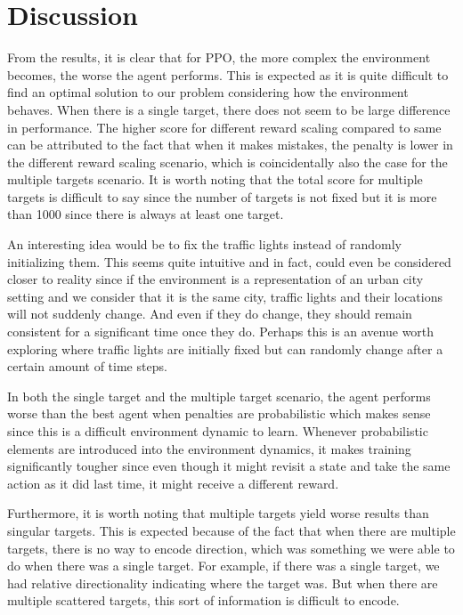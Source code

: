\documentclass{article}
\begin{document}
    \section{Discussion}
    \label{discussion}
    From the results, it is clear that for PPO, the more complex the environment becomes, the worse the agent performs. This is expected as it is quite difficult to find an optimal solution to our problem considering how the environment behaves. When there is a single target, there does not seem to be large difference in performance. The higher score for different reward scaling compared to same can be attributed to the fact that when it makes mistakes, the penalty is lower in the different reward scaling scenario, which is coincidentally also the case for the multiple targets scenario. It is worth noting that the total score for multiple targets is difficult to say since the number of targets is not fixed but it is more than 1000 since there is always at least one target.
    
    An interesting idea would be to fix the traffic lights instead of randomly initializing them. This seems quite intuitive and in fact, could even be considered closer to reality since if the environment is a representation of an urban city setting and we consider that it is the same city, traffic lights and their locations will not suddenly change. And even if they do change, they should remain consistent for a significant time once they do. Perhaps this is an avenue worth exploring where traffic lights are initially fixed but can randomly change after a certain amount of time steps. 
    
    In both the single target and the multiple target scenario, the agent performs worse than the best agent when penalties are probabilistic which makes sense since this is a difficult environment dynamic to learn. Whenever probabilistic elements are introduced into the environment dynamics, it makes training significantly tougher since even though it might revisit a state and take the same action as it did last time, it might receive a different reward.
    
    Furthermore, it is worth noting that multiple targets yield worse results than singular targets. This is expected because of the fact that when there are multiple targets, there is no way to encode direction, which was something we were able to do when there was a single target. For example, if there was a single target, we had relative directionality indicating where the target was. But when there are multiple scattered targets, this sort of information is difficult to encode. 
    
\end{document}
